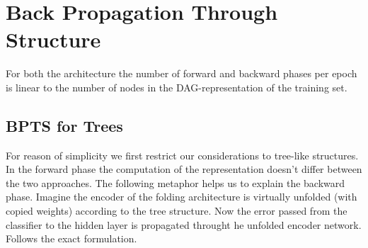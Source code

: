 \section{Back Propagation Through Structure}

For both the architecture the number of forward and backward phases per epoch is
linear to the number of nodes in the DAG-representation of the training set.

\subsection{BPTS for Trees}

For reason of simplicity we first restrict our considerations to tree-like
structures. In the forward phase the computation of the representation doesn't
differ between the two approaches. The following metaphor helps us to explain
the backward phase. Imagine the encoder of the folding architecture is virtually
unfolded (with copied weights) according to the tree structure. Now the error
passed from the classifier to the hidden layer is propagated throught he
unfolded encoder network. Follows the exact formulation.
